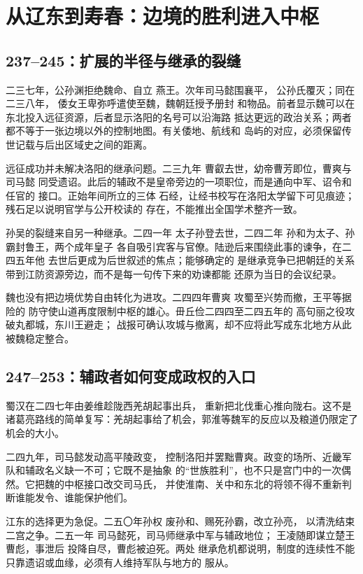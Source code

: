 \section{从辽东到寿春：边境的胜利进入中枢}

\subsection{237--245：扩展的半径与继承的裂缝}

二三七年，公孙渊拒绝魏命、自立
燕王。次年司马懿围襄平，
公孙氏覆灭；同在二三八年，
倭女王卑弥呼遣使至魏，魏朝廷授予册封
和物品。前者显示魏可以在东北投入远征资源，后者显示洛阳的名号可以沿海路
抵达更远的政治关系；两者都不等于一张边境以外的控制地图。有关倭地、航线和
岛屿的对应，必须保留传世记载与后出区域史之间的距离。

远征成功并未解决洛阳的继承问题。二三九年
曹叡去世，幼帝曹芳即位，曹爽与司马懿
同受遗诏。此后的辅政不是皇帝旁边的一项职位，而是通向中军、诏令和任官的
接口。正始年间所立的三体
石经，让经书校写在洛阳太学留下可见痕迹；残石足以说明官学与公开校读的
存在，不能推出全国学术整齐一致。

孙吴的裂缝来自另一种继承。二四一年
太子孙登去世，二四二年
孙和为太子、孙霸封鲁王，两个成年皇子
各自吸引宾客与官僚。陆逊后来围绕此事的谏争，在二四五年他
去世后更成为后世叙述的焦点；能够确定的
是继承竞争已把朝廷的关系带到江防资源旁边，而不是每一句传下来的劝谏都能
还原为当日的会议纪录。

魏也没有把边境优势自由转化为进攻。二四四年曹爽
攻蜀至兴势而撤，王平等据险的
防守使山道再度限制中枢的雄心。毌丘俭二四四至二四五年的
高句丽之役攻破丸都城，东川王避走；
战报可确认攻城与撤离，却不应将此写成东北地方从此被魏稳定整合。

\subsection{247--253：辅政者如何变成政权的入口}

蜀汉在二四七年由姜维趁陇西羌胡起事出兵，
重新把北伐重心推向陇右。这不是
诸葛亮路线的简单复写：羌胡起事给了机会，郭淮等魏军的反应以及粮道仍限定了
机会的大小。

二四九年，司马懿发动高平陵政变，
控制洛阳并罢黜曹爽。政变的场所、近畿军队和辅政名义缺一不可；它既不是抽象
的“世族胜利”，也不只是宫门中的一次偶然。它把魏的中枢接口改交司马氏，
并使淮南、关中和东北的将领不得不重新判断谁能发令、谁能保护他们。

江东的选择更为急促。二五〇年孙权
废孙和、赐死孙霸，改立孙亮，
以清洗结束二宫之争。二五一年
司马懿死，司马师继承中军与辅政地位；
王凌随即谋立楚王曹彪，事泄后
投降自尽，曹彪被迫死。两处
继承危机都说明，制度的连续性不能只靠遗诏或血缘，必须有人维持军队与地方的
服从。

